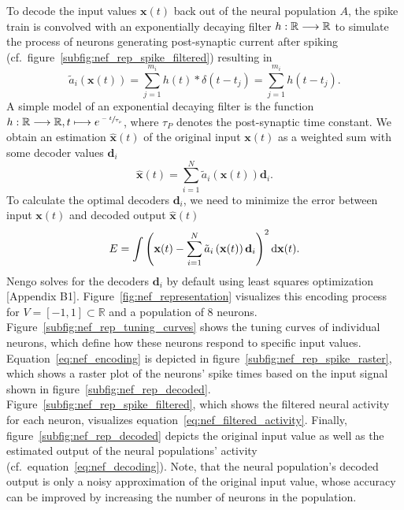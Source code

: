 To decode the input values $\mathbf{x}(t)$ back out of the neural population $A$, the spike train is convolved with an exponentially decaying filter $h: \mathbb{R} \longrightarrow \mathbb{R}$ to simulate the process of neurons generating post-synaptic current after spiking (cf.\ figure~\ref{subfig:nef_rep_spike_filtered}) resulting in
\begin{equation}
\tilde{a}_{i}\left(\mathbf{x}(t)\right) = \sum_{j=1}^{m_{i}} h(t) \ast \delta(t - t_{j}) = \sum_{j=1}^{m_{i}} h(t - t_{j}).
\label{eq:nef_filtered_activity}
\end{equation}
A simple model of an exponential decaying filter is the function $h: \mathbb{R} \longrightarrow \mathbb{R}, t \longmapsto e^{\sfrac{-t}{\tau_{p}}}$, where $\tau_{P}$ denotes the post-synaptic time constant.
We obtain an estimation $\mathbf{\hat{x}}(t)$ of the original input $\mathbf{x}(t)$ as a weighted sum with some decoder values $\mathbf{d}_{i}$
\begin{equation}
\mathbf{\hat{x}}(t) = \sum_{i=1}^{N} \tilde{a}_{i}\left(\mathbf{x}(t)\right) \mathbf{d}_{i}.
\label{eq:nef_decoding}
\end{equation}
To calculate the optimal decoders $\mathbf{d}_{i}$, we need to minimize the error between input $\mathbf{x}(t)$ and decoded output $\mathbf{\hat{x}}(t)$
\begin{equation}
E = \int \left( \mathbf{x}(t) - \sum_{i=1}^{N} \tilde{a}_{i}\left(\mathbf{x}(t)\right) \mathbf{d}_{i}\right)^{2} \mathop{}\!\mathrm{d} \mathbf{x}(t).
\label{eq:decoder_calculation}
\end{equation}
\ac{Nengo} solves for the decoders $\mathbf{d}_{i}$ by default using least squares optimization \parencite{Eliasmith2013}[Appendix B1].
Figure~\ref{fig:nef_representation} visualizes this encoding process for $V = \left[ -1, 1\right] \subset \mathbb{R}$ and a population of $8$ neurons.
Figure~\ref{subfig:nef_rep_tuning_curves} shows the tuning curves of individual neurons, which define how these neurons respond to specific input values.
Equation~\eqref{eq:nef_encoding} is depicted in figure~\ref{subfig:nef_rep_spike_raster}, which shows a raster plot of the neurons' spike times based on the input signal shown in figure~\ref{subfig:nef_rep_decoded}.
Figure~\ref{subfig:nef_rep_spike_filtered}, which shows the filtered neural activity for each neuron, visualizes equation~\eqref{eq:nef_filtered_activity}.
Finally, figure~\ref{subfig:nef_rep_decoded} depicts the original input value as well as the estimated output of the neural populations' activity (cf.\ equation~\eqref{eq:nef_decoding}).
Note, that the neural population's decoded output is only a noisy approximation of the original input value, whose accuracy can be improved by increasing the number of neurons in the population.
